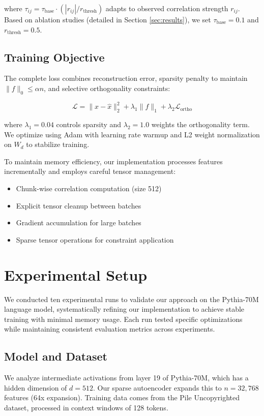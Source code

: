 \documentclass{article} %
\begin{document}
where $\tau_{ij} = \tau_{\text{base}} \cdot (|r_{ij}|/r_{\text{thresh}})$ adapts to observed correlation strength $r_{ij}$. Based on ablation studies (detailed in Section \ref{sec:results}), we set $\tau_{\text{base}}=0.1$ and $r_{\text{thresh}}=0.5$.

\subsection{Training Objective}
The complete loss combines reconstruction error, sparsity penalty to maintain $\|f\|_0 \leq \alpha n$, and selective orthogonality constraints:

\begin{equation}
    \mathcal{L} = \|x - \hat{x}\|_2^2 + \lambda_1\|f\|_1 + \lambda_2\mathcal{L}_{\text{ortho}}
\end{equation}

where $\lambda_1=0.04$ controls sparsity and $\lambda_2=1.0$ weights the orthogonality term. We optimize using Adam \cite{kingma2014adam} with learning rate warmup and L2 weight normalization on $W_d$ to stabilize training.

To maintain memory efficiency, our implementation processes features incrementally and employs careful tensor management:
\begin{itemize}
    \item Chunk-wise correlation computation (size 512)
    \item Explicit tensor cleanup between batches
    \item Gradient accumulation for large batches
    \item Sparse tensor operations for constraint application
\end{itemize}

\section{Experimental Setup}
\label{sec:experimental}

We conducted ten experimental runs to validate our approach on the Pythia-70M language model, systematically refining our implementation to achieve stable training with minimal memory usage. Each run tested specific optimizations while maintaining consistent evaluation metrics across experiments.

\subsection{Model and Dataset}
We analyze intermediate activations from layer 19 of Pythia-70M, which has a hidden dimension of $d=512$. Our sparse autoencoder expands this to $n=32,768$ features (64x expansion). Training data comes from the Pile Uncopyrighted dataset, processed in context windows of 128 tokens.
\end{document}
